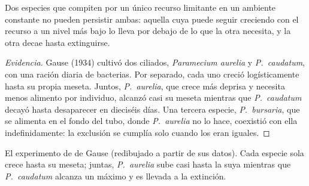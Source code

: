 \begin{proposition}\label{prop:b1:species-interactions:gause}
Dos especies que compiten por un único recurso limitante en un ambiente
constante no pueden persistir ambas: aquella cuya  puede seguir
creciendo con el recurso a un nivel más bajo lo lleva por debajo de lo que
la otra necesita, y la otra decae hasta extinguirse.
\end{proposition}
\begin{proof}[Evidencia]
Gause (1934) cultivó dos ciliados, \emph{Paramecium aurelia} y
\emph{P.~caudatum}, con una ración diaria de bacterias. Por separado, cada
uno creció logísticamente hasta su propia meseta. Juntos, \emph{P.~aurelia},
que crece más deprisa y necesita menos alimento por individuo, alcanzó casi
su meseta mientras que \emph{P.~caudatum} decayó hasta desaparecer en
dieciséis días. Una tercera especie, \emph{P.~bursaria}, que se alimenta en
el fondo del tubo, donde \emph{P.~aurelia} no lo hace, coexistió con ella
indefinidamente: la exclusión se cumplía solo cuando los  eran iguales.
\end{proof}

\begin{omfigure}

{\small El experimento de  de Gause (redibujado a partir de sus
datos). Cada especie sola crece hasta su meseta; juntas, \emph{P.~aurelia}
sube casi hasta la suya mientras que \emph{P.~caudatum} alcanza un máximo y
es llevada a la extinción.}
\end{omfigure}

